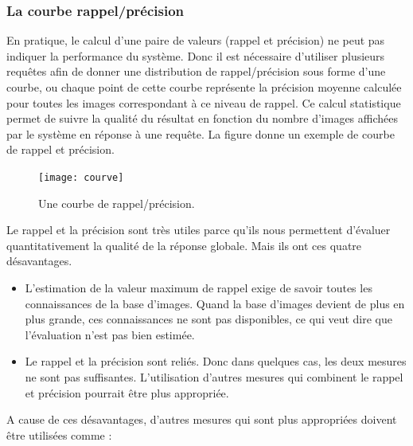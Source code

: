 \subsubsection{La courbe rappel/précision}
En pratique, le calcul d’une paire de valeurs (rappel et précision) ne
peut pas indiquer la performance du système. Donc il est nécessaire
d’utiliser plusieurs requêtes afin de donner une distribution de
rappel/précision sous forme d’une courbe, ou chaque point de cette courbe
représente la précision moyenne calculée pour toutes les images
correspondant à ce niveau de rappel. Ce calcul statistique permet de suivre
la qualité du résultat en fonction du nombre d’images affichées par le
système en réponse à une requête.
La figure donne un exemple de courbe de rappel et précision.
\begin{figure}[H]
	\centering
	\texttt{[image: courve]} 
	\caption{Une courbe de rappel/précision.}
\end{figure}

Le rappel et la précision sont très utiles parce qu’ils nous permettent
d’évaluer quantitativement la qualité de la réponse globale. Mais ils ont ces quatre désavantages.
\begin{itemize}
	\item L’estimation de la valeur maximum de rappel exige de savoir toutes les connaissances de la base d’images. Quand la base d’images devient de plus en plus grande, ces connaissances ne sont pas disponibles, ce qui veut dire que l’évaluation n’est pas bien estimée.
	\item Le rappel et la précision sont reliés. Donc dans quelques cas, les deux mesures ne sont pas suffisantes. L’utilisation d’autres mesures qui combinent le rappel et précision pourrait être plus appropriée.
\end{itemize}

A cause de ces désavantages, d’autres mesures qui sont plus appropriées
doivent être utilisées comme :

